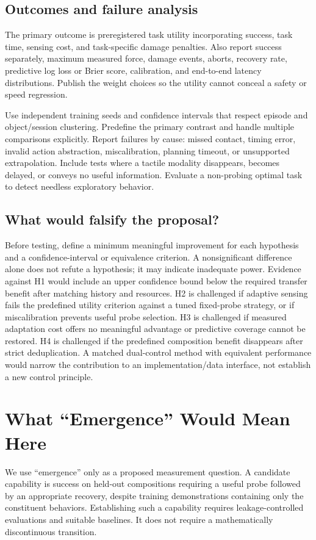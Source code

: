 \documentclass[11pt]{article}
\begin{document}
\subsection{Outcomes and failure analysis}
The primary outcome is preregistered task utility incorporating success, task time, sensing cost, and task-specific damage penalties. Also report success separately, maximum measured force, damage events, aborts, recovery rate, predictive log loss or Brier score, calibration, and end-to-end latency distributions. Publish the weight choices so the utility cannot conceal a safety or speed regression.

Use independent training seeds and confidence intervals that respect episode and object/session clustering. Predefine the primary contrast and handle multiple comparisons explicitly. Report failures by cause: missed contact, timing error, invalid action abstraction, miscalibration, planning timeout, or unsupported extrapolation. Include tests where a tactile modality disappears, becomes delayed, or conveys no useful information. Evaluate a non-probing optimal task to detect needless exploratory behavior.

\subsection{What would falsify the proposal?}
Before testing, define a minimum meaningful improvement for each hypothesis and a confidence-interval or equivalence criterion. A nonsignificant difference alone does not refute a hypothesis; it may indicate inadequate power. Evidence against H1 would include an upper confidence bound below the required transfer benefit after matching history and resources. H2 is challenged if adaptive sensing fails the predefined utility criterion against a tuned fixed-probe strategy, or if miscalibration prevents useful probe selection. H3 is challenged if measured adaptation cost offers no meaningful advantage or predictive coverage cannot be restored. H4 is challenged if the predefined composition benefit disappears after strict deduplication. A matched dual-control method with equivalent performance would narrow the contribution to an implementation/data interface, not establish a new control principle.

\section{What ``Emergence'' Would Mean Here}
We use ``emergence'' only as a proposed measurement question. A candidate capability is success on held-out compositions requiring a useful probe followed by an appropriate recovery, despite training demonstrations containing only the constituent behaviors. Establishing such a capability requires leakage-controlled evaluations and suitable baselines. It does not require a mathematically discontinuous transition.
\end{document}
